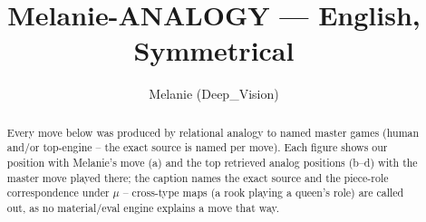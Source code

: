 \documentclass[11pt]{article}
\title{Melanie-ANALOGY — English, Symmetrical}
\author{Melanie (Deep\_Vision)}
\date{}
\begin{document}
\maketitle

\begin{abstract}Every move below was produced by relational analogy to named master games (human and/or top-engine -- the exact source is named per move). Each figure shows our position with Melanie's move (a) and the top retrieved analog positions (b--d) with the master move played there; the caption names the exact source and the piece-role correspondence under $\mu$ -- cross-type maps (a rook playing a queen's role) are called out, as no material/eval engine explains a move that way.\end{abstract}

\begin{figure}[p]\centering
\begin{subfigure}{0.46\textwidth}\centering
\resizebox{\linewidth}{!}{%
\newchessgame
\chessboard[
  setfen={r1bq1rk1/pp1pppbp/2n2np1/2p5/2P4P/2N2NP1/PP1PPPB1/R1BQ1RK1 b - - 0 7},
  showmover=false,
  pgfstyle=straightmove, color=movearrow, markmove={a8-b8}
]}
\caption{}
\end{subfigure}\hfill
\begin{subfigure}{0.46\textwidth}\centering
\resizebox{\linewidth}{!}{%
\newchessgame
\chessboard[
  setfen={r1bq1rk1/pp2ppbp/2np1np1/2p5/2P5/P1N2NP1/1P1PPPBP/R1BQ1RK1 w - - 1 8},
  showmover=false,
  pgfstyle=straightmove, color=movearrow, markmove={a1-b1}
]}
\caption{}
\end{subfigure}
\\[4pt]
\begin{subfigure}{0.46\textwidth}\centering
\resizebox{\linewidth}{!}{%
\newchessgame
\chessboard[
  setfen={r1bq1rk1/pp2ppbp/2np1np1/2p5/2P5/P1N2NP1/1P1PPPBP/R1BQ1RK1 w - - 1 8},
  showmover=false,
  pgfstyle=straightmove, color=movearrow, markmove={a1-b1}
]}
\caption{}
\end{subfigure}\hfill
\begin{subfigure}{0.46\textwidth}\centering
\resizebox{\linewidth}{!}{%
\newchessgame
\chessboard[
  setfen={r1bq1rk1/1pppppbp/p1n2np1/8/2PP4/2N2NP1/PP2PPBP/R1BQ1RK1 b - - 0 7},
  showmover=false,
  pgfstyle=straightmove, color=movearrow, markmove={a8-b8}
]}
\caption{}
\end{subfigure}

\end{figure}
\end{document}
